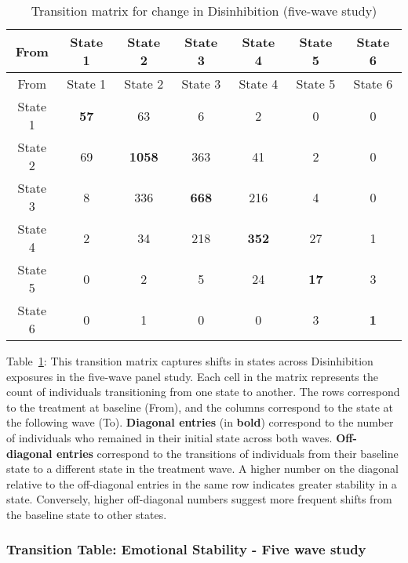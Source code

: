\documentclass[
  single column]{article}
\begin{document}
\begin{longtable}[]{@{}ccccccc@{}}
\caption{Transition matrix for change in Disinhibition (five-wave
study)}\label{tbl-table-transition-disinhibition-long}\tabularnewline
\toprule\noalign{}
From & State 1 & State 2 & State 3 & State 4 & State 5 & State 6 \\
\midrule\noalign{}
\endfirsthead
\toprule\noalign{}
From & State 1 & State 2 & State 3 & State 4 & State 5 & State 6 \\
\midrule\noalign{}
\endhead
\bottomrule\noalign{}
\endlastfoot
State 1 & \textbf{57} & 63 & 6 & 2 & 0 & 0 \\
State 2 & 69 & \textbf{1058} & 363 & 41 & 2 & 0 \\
State 3 & 8 & 336 & \textbf{668} & 216 & 4 & 0 \\
State 4 & 2 & 34 & 218 & \textbf{352} & 27 & 1 \\
State 5 & 0 & 2 & 5 & 24 & \textbf{17} & 3 \\
State 6 & 0 & 1 & 0 & 0 & 3 & \textbf{1} \\
\end{longtable}

Table~\ref{tbl-table-transition-disinhibition-long}: This transition
matrix captures shifts in states across Disinhibition exposures in the
five-wave panel study. Each cell in the matrix represents the count of
individuals transitioning from one state to another. The rows correspond
to the treatment at baseline (From), and the columns correspond to the
state at the following wave (To). \textbf{Diagonal entries} (in
\textbf{bold}) correspond to the number of individuals who remained in
their initial state across both waves. \textbf{Off-diagonal entries}
correspond to the transitions of individuals from their baseline state
to a different state in the treatment wave. A higher number on the
diagonal relative to the off-diagonal entries in the same row indicates
greater stability in a state. Conversely, higher off-diagonal numbers
suggest more frequent shifts from the baseline state to other states.

\subsubsection{Transition Table: Emotional Stability - Five wave
study}\label{transition-table-emotional-stability---five-wave-study}
\end{document}
